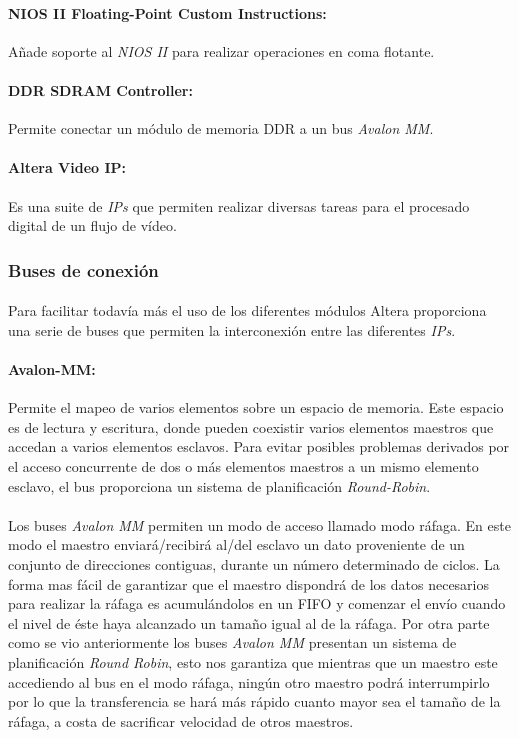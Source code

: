 \documentclass[a4paper,12pt,titlepage,final]{book}
\begin{document}
\paragraph{NIOS II Floating-Point Custom Instructions:}
Añade soporte al \textit{NIOS II} para realizar operaciones en coma flotante.

\paragraph{DDR SDRAM Controller:}
Permite conectar un módulo de memoria DDR a un bus \textit{Avalon MM}.

\paragraph{Altera Video IP:}
Es una suite de \textit{IPs} que permiten realizar diversas tareas para el procesado digital de un flujo de vídeo.

\subsubsection{Buses de conexión}

\paragraph{}
Para facilitar todavía más el uso de los diferentes módulos Altera proporciona una serie de buses que permiten la interconexión entre las diferentes \textit{IPs}.

\paragraph{Avalon-MM:}
Permite el mapeo de varios elementos sobre un espacio de memoria. Este espacio es de lectura y escritura, donde pueden coexistir varios elementos maestros que accedan a varios elementos esclavos. Para evitar posibles problemas derivados por el acceso concurrente de dos o más elementos maestros a un mismo elemento esclavo, el bus proporciona un sistema de planificación \textit{Round-Robin}.

\paragraph{}
Los buses \textit{Avalon MM} permiten un modo de acceso llamado modo ráfaga. En este modo el maestro enviará/recibirá al/del esclavo un dato proveniente de un conjunto de direcciones contiguas, durante un número determinado de ciclos. La forma mas fácil de garantizar que el maestro dispondrá de los datos necesarios para realizar la ráfaga es acumulándolos en un FIFO y comenzar el envío cuando el nivel de éste haya alcanzado un tamaño igual al de la ráfaga. Por otra parte como se vio anteriormente los buses \textit{Avalon MM} presentan un sistema de planificación \textit{Round Robin}, esto nos garantiza que mientras que un maestro este accediendo al bus en el modo ráfaga, ningún otro maestro podrá interrumpirlo por lo que la transferencia se hará más rápido cuanto mayor sea el tamaño de la ráfaga, a costa de sacrificar velocidad de otros maestros. 
\end{document}
